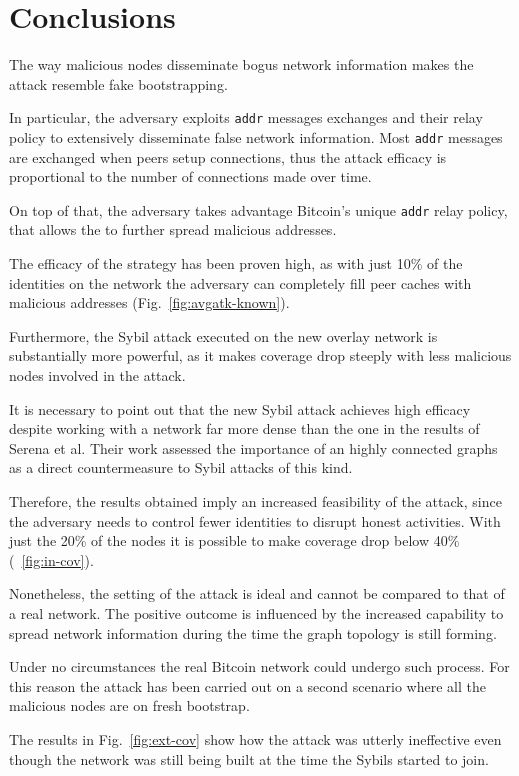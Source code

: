 \chapter{Conclusions}
\label{sec:concl}

The way malicious nodes disseminate bogus network information makes the attack resemble fake bootstrapping.

In particular, the adversary exploits \texttt{addr} messages exchanges and their relay policy to extensively disseminate false network information. Most \texttt{addr} messages are exchanged when peers setup connections, thus the attack efficacy is proportional to the number of connections made over time.

On top of that, the adversary takes advantage Bitcoin's unique \texttt{addr} relay policy, that allows the to further spread malicious addresses.

The efficacy of the strategy has been proven high, as with just 10\% of the identities on the network the adversary can completely fill peer caches with malicious addresses (Fig.~\ref{fig:avgatk-known}).

Furthermore, the Sybil attack executed on the new overlay network is substantially more powerful, as it makes coverage drop steeply with less malicious nodes involved in the attack.

It is necessary to point out that the new Sybil attack achieves high efficacy despite working with a network far more dense than the one in the results of Serena et al. Their work assessed the importance of an highly connected graphs as a direct countermeasure to Sybil attacks of this kind.

Therefore, the results obtained imply an increased feasibility of the attack, since the adversary needs to control fewer identities to disrupt honest activities. With just the 20\% of the nodes it is possible to make coverage drop below 40\% (~\ref{fig:in-cov}).\par

Nonetheless, the setting of the attack is ideal and cannot be compared to that of a real network. The positive outcome is influenced by the increased capability to spread network information during the time the graph topology is still forming.

Under no circumstances the real Bitcoin network could undergo such process. For this reason the attack has been carried out on a second scenario where all the malicious nodes are on fresh bootstrap.

The results in Fig.~\ref{fig:ext-cov} show how the attack was utterly ineffective even though the network was still being built at the time the Sybils started to join.
 
